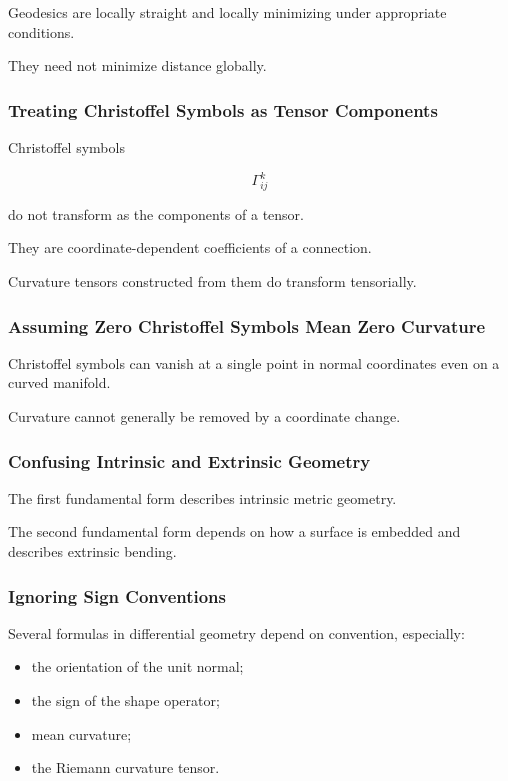 Geodesics are locally straight and locally minimizing under appropriate
conditions.

They need not minimize distance globally.

\subsubsection{Treating Christoffel Symbols as Tensor Components}

Christoffel symbols

\[
\Gamma^k_{ij}
\]

do not transform as the components of a tensor.

They are coordinate-dependent coefficients of a connection.

Curvature tensors constructed from them do transform tensorially.

\subsubsection{Assuming Zero Christoffel Symbols Mean Zero Curvature}

Christoffel symbols can vanish at a single point in normal coordinates even
on a curved manifold.

Curvature cannot generally be removed by a coordinate change.

\subsubsection{Confusing Intrinsic and Extrinsic Geometry}

The first fundamental form describes intrinsic metric geometry.

The second fundamental form depends on how a surface is embedded and
describes extrinsic bending.

\subsubsection{Ignoring Sign Conventions}

Several formulas in differential geometry depend on convention, especially:

\begin{itemize}
    \item the orientation of the unit normal;
    \item the sign of the shape operator;
    \item mean curvature;
    \item the Riemann curvature tensor.
\end{itemize}

